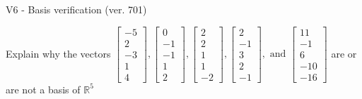 \begin{exercise}
  \begin{exerciseTitle}V6 - Basis verification (ver. 701)\end{exerciseTitle}
  \begin{exerciseStatement}
    Explain why the vectors \(\left[\begin{array}{r}
-5 \\
2 \\
-3 \\
1 \\
4
\end{array}\right] , \left[\begin{array}{r}
0 \\
-1 \\
-1 \\
1 \\
2
\end{array}\right] , \left[\begin{array}{r}
2 \\
2 \\
1 \\
1 \\
-2
\end{array}\right] , \left[\begin{array}{r}
2 \\
-1 \\
3 \\
2 \\
-1
\end{array}\right] , \text{ and } \left[\begin{array}{r}
11 \\
-1 \\
6 \\
-10 \\
-16
\end{array}\right]\) are or are not a basis of \(\mathbb{R}^5\)	



\end{exerciseStatement}
\end{exercise}
